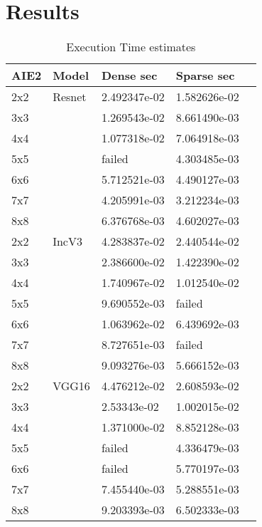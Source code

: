 \documentclass{IEEEtran}
\begin{document}
\section{Results}
\label{sec:experiments}
\begin{table}[htb]
  \caption{Execution Time estimates}
  \label{tab_perf}
\begin{center} 
\begin{tabular}{|l|l|l|l|l|}
  \hline
  AIE2 & Model  & Dense sec      & Sparse sec      \\ \hline\hline
  2x2   & Resnet & 2.492347e-02  & 1.582626e-02 \\ \hline
  3x3   &  & 1.269543e-02  & 8.661490e-03 \\ \hline
  4x4   &  &  1.077318e-02 & 7.064918e-03 \\ \hline
  5x5   &  &  failed       & 4.303485e-03 \\ \hline
  6x6   &  &  5.712521e-03 & 4.490127e-03 \\ \hline
  7x7   &  &  4.205991e-03 & 3.212234e-03 \\ \hline
  8x8   &  &  6.376768e-03 & 4.602027e-03 \\ \hline \hline
  2x2   & IncV3  & 4.283837e-02  & 2.440544e-02 \\ \hline
  3x3   &   & 2.386600e-02  & 1.422390e-02 \\ \hline
  4x4   &   &  1.740967e-02 & 1.012540e-02 \\ \hline
  5x5   &   &  9.690552e-03 & failed       \\ \hline
  6x6   &   &  1.063962e-02 & 6.439692e-03 \\ \hline
  7x7   &   &  8.727651e-03 & failed       \\ \hline
  8x8   &   &  9.093276e-03 & 5.666152e-03 \\ \hline \hline
  2x2   & VGG16  & 4.476212e-02  & 2.608593e-02 \\ \hline
  3x3   &   &  2.53343e-02  & 1.002015e-02 \\ \hline
  4x4   &   &  1.371000e-02 & 8.852128e-03 \\ \hline
  5x5   &   &  failed       & 4.336479e-03 \\ \hline
  6x6   &   &  failed       & 5.770197e-03 \\ \hline
  7x7   &   &  7.455440e-03 & 5.288551e-03 \\ \hline
  8x8   &   &  9.203393e-03 & 6.502333e-03 \\ \hline \hline
          
\end{tabular}
\end{center}
\end{table}
\end{document}
